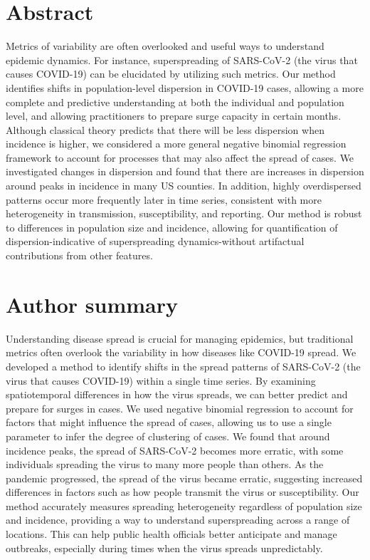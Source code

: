 \documentclass[10pt,letterpaper]{article}
\begin{document}
\section*{Abstract}
Metrics of variability are often overlooked and useful ways to understand epidemic dynamics. 
For instance, superspreading of SARS-CoV-2 (the virus that causes COVID-19) can be elucidated by utilizing such metrics. 
Our method identifies shifts in population-level dispersion in COVID-19 cases, allowing a more complete and predictive understanding at both the individual and population level, and allowing practitioners to prepare surge capacity in certain months. 
Although classical theory predicts that there will be less dispersion when incidence is higher, we considered a more general negative binomial regression framework to account for processes that may also affect the spread of cases. 
We investigated changes in dispersion and found that there are increases in dispersion around peaks in incidence in many US counties.
In addition, highly overdispersed patterns occur more frequently later in time series, consistent with more heterogeneity in transmission, susceptibility, and reporting. 
Our method is robust to differences in population size and incidence, allowing for quantification of dispersion-indicative of superspreading dynamics-without artifactual contributions from other features.


\section*{Author summary}
Understanding disease spread is crucial for managing epidemics, but traditional metrics often overlook the variability in how diseases like COVID-19 spread. 
We developed a method to identify shifts in the spread patterns of SARS-CoV-2 (the virus that causes COVID-19) within a single time series.
By examining spatiotemporal differences in how the virus spreads, we can better predict and prepare for surges in cases.
We used negative binomial regression to account for factors that might influence the spread of cases, allowing us to use a single parameter to infer the degree of clustering of cases. 
We found that around incidence peaks, the spread of SARS-CoV-2 becomes more erratic, with some individuals spreading the virus to many more people than others. 
As the pandemic progressed, the spread of the virus became erratic, suggesting increased differences in factors such as how people transmit the virus or susceptibility.
Our method accurately measures spreading heterogeneity regardless of population size and incidence, providing a way to understand superspreading across a range of locations. 
This can help public health officials better anticipate and manage outbreaks, especially during times when the virus spreads unpredictably.
\end{document}
